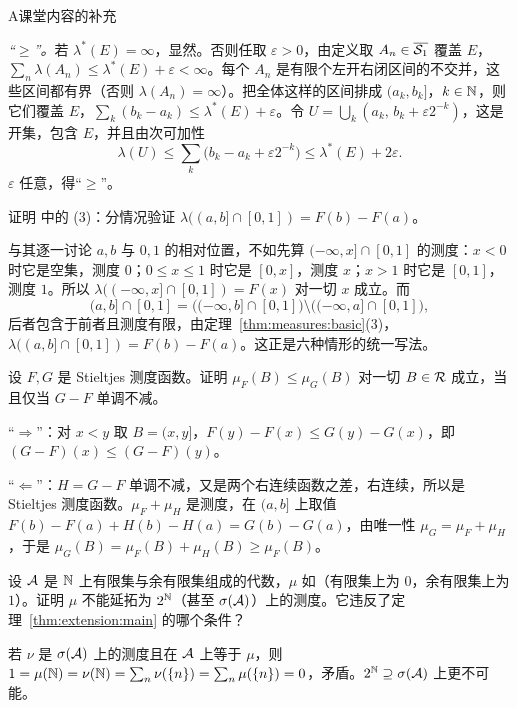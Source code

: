 \begin{exercises}{A}{课堂内容的补充}
\begin{questions}
\begin{solution}
\emph{“$\geqslant$”。}若 $\lambda^*(E)=\infty$，显然。否则任取 $\varepsilon>0$，由定义取 $A_n\in\overline{\mathcal{S}_1}$ 覆盖 $E$，$\sum_n\lambda(A_n)\leqslant\lambda^*(E)+\varepsilon<\infty$。每个 $A_n$ 是有限个左开右闭区间的不交并，这些区间都有界（否则 $\lambda(A_n)=\infty$）。把全体这样的区间排成 $(a_k,b_k]$，$k\in\mathbb{N}$，则它们覆盖 $E$，$\sum_k(b_k-a_k)\leqslant\lambda^*(E)+\varepsilon$。令 $U=\bigcup_k(a_k,\,b_k+\varepsilon2^{-k})$，这是开集，包含 $E$，并且由次可加性
\[
\lambda(U)\leqslant\sum_k\bigl(b_k-a_k+\varepsilon2^{-k}\bigr)\leqslant\lambda^*(E)+2\varepsilon .
\]
$\varepsilon$ 任意，得“$\geqslant$”。
\end{solution}
\end{questions}

\item\label{ex:extension:A6} 证明 中的 (3)：分情况验证 $\lambda((a,b]\cap[0,1])=F(b)-F(a)$。
\begin{solution}
与其逐一讨论 $a,b$ 与 $0,1$ 的相对位置，不如先算 $(-\infty,x]\cap[0,1]$ 的测度：$x<0$ 时它是空集，测度 $0$；$0\leqslant x\leqslant1$ 时它是 $[0,x]$，测度 $x$；$x>1$ 时它是 $[0,1]$，测度 $1$。所以 $\lambda((-\infty,x]\cap[0,1])=F(x)$ 对一切 $x$ 成立。而
\[
(a,b]\cap[0,1]=\bigl((-\infty,b]\cap[0,1]\bigr)\setminus\bigl((-\infty,a]\cap[0,1]\bigr),
\]
后者包含于前者且测度有限，由定理~\ref{thm:measures:basic}(3)，$\lambda((a,b]\cap[0,1])=F(b)-F(a)$。这正是六种情形的统一写法。
\end{solution}

\item\label{ex:extension:A7} 设 $F,G$ 是 Stieltjes 测度函数。证明 $\mu_F(B)\leqslant\mu_G(B)$ 对一切 $B\in\mathcal{R}$ 成立，当且仅当 $G-F$ 单调不减。
\begin{solution}
“$\Rightarrow$”：对 $x<y$ 取 $B=(x,y]$，$F(y)-F(x)\leqslant G(y)-G(x)$，即 $(G-F)(x)\leqslant(G-F)(y)$。

“$\Leftarrow$”：$H=G-F$ 单调不减，又是两个右连续函数之差，右连续，所以是 Stieltjes 测度函数。$\mu_F+\mu_H$ 是测度，在 $(a,b]$ 上取值 $F(b)-F(a)+H(b)-H(a)=G(b)-G(a)$，由唯一性 $\mu_G=\mu_F+\mu_H$，于是 $\mu_G(B)=\mu_F(B)+\mu_H(B)\geqslant\mu_F(B)$。
\end{solution}

\item\label{ex:extension:A8} 设 $\mathcal{A}$ 是 $\mathbb{N}$ 上有限集与余有限集组成的代数，$\mu$ 如（有限集上为 $0$，余有限集上为 $1$）。证明 $\mu$ 不能延拓为 $2^{\mathbb{N}}$（甚至 $\sigma(\mathcal{A})$）上的测度。它违反了定理~\ref{thm:extension:main} 的哪个条件？
\begin{solution}
若 $\nu$ 是 $\sigma(\mathcal{A})$ 上的测度且在 $\mathcal{A}$ 上等于 $\mu$，则 $1=\mu(\mathbb{N})=\nu(\mathbb{N})=\sum_n\nu(\{n\})=\sum_n\mu(\{n\})=0$，矛盾。$2^{\mathbb{N}}\supseteq\sigma(\mathcal{A})$ 上更不可能。


\end{solution}
\end{exercises}
